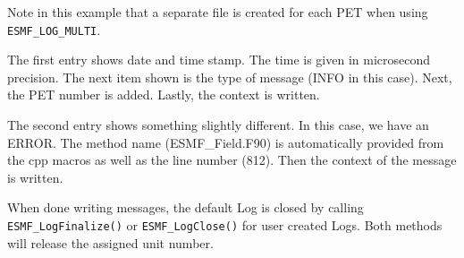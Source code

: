 Note in this example that a separate file is created for each PET when using
{\tt ESMF\_LOG\_MULTI}.

The first entry shows date and time stamp.  The time is given in microsecond 
precision.  The next item shown is the type of message (INFO in this case).  
Next, the PET number is added.  Lastly, the context is written.

The second entry shows something slightly different.  In this case, we have
an ERROR.  The method name (ESMF\_Field.F90) is automatically provided from 
the cpp macros as well as the line number (812).  Then the context of the 
message is written.
 
When done writing messages, the default Log is closed by calling 
{\tt ESMF\_LogFinalize()}  or {\tt ESMF\_LogClose()} for user created Logs.  
Both methods will release the assigned unit number.




